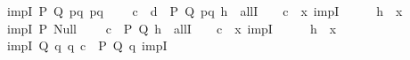 \begin{isabellebody}
%
\isadelimproof
%
\endisadelimproof
\isanewline
\isanewline
{}\isamarkupfalse%
\isanewline
\ \ impI\ {\isacharparenleft}{\kern0pt}P{\isacharcomma}{\kern0pt}\ Q{\isacharparenright}{\kern0pt}{\isacharcolon}{\kern0pt}\ {\isachardoublequoteopen}{\isasymlambda}pq{\isachardot}{\kern0pt}\ pq{\isachardoublequoteclose}\isanewline
\ \ \ \ {\isachardoublequoteopen}\isactrlbold {\isasymlambda}{\isacharparenleft}{\kern0pt}c{\isacharcolon}{\kern0pt}\ {\isacharunderscore}{\kern0pt}{\isacharparenright}{\kern0pt}\ {\isacharparenleft}{\kern0pt}d{\isacharcolon}{\kern0pt}\ {\isacharunderscore}{\kern0pt}{\isacharparenright}{\kern0pt}\ P\ Q\ pq\ {\isacharparenleft}{\kern0pt}h{\isacharcolon}{\kern0pt}\ {\isacharunderscore}{\kern0pt}{\isacharparenright}{\kern0pt}{\isachardot}{\kern0pt}\ allI\ {\isasymcdot}\ {\isacharunderscore}{\kern0pt}\ {\isasymbullet}\ c\ {\isasymbullet}\ {\isacharparenleft}{\kern0pt}\isactrlbold {\isasymlambda}x{\isachardot}{\kern0pt}\ impI\ {\isasymcdot}\ {\isacharunderscore}{\kern0pt}\ {\isasymcdot}\ {\isacharunderscore}{\kern0pt}\ {\isasymbullet}\ {\isacharparenleft}{\kern0pt}h\ {\isasymcdot}\ x{\isacharparenright}{\kern0pt}{\isacharparenright}{\kern0pt}{\isachardoublequoteclose}\isanewline
\isanewline
\ \ impI\ {\isacharparenleft}{\kern0pt}P{\isacharparenright}{\kern0pt}{\isacharcolon}{\kern0pt}\ {\isachardoublequoteopen}Null{\isachardoublequoteclose}\isanewline
\ \ \ \ {\isachardoublequoteopen}\isactrlbold {\isasymlambda}{\isacharparenleft}{\kern0pt}c{\isacharcolon}{\kern0pt}\ {\isacharunderscore}{\kern0pt}{\isacharparenright}{\kern0pt}\ P\ Q\ {\isacharparenleft}{\kern0pt}h{\isacharcolon}{\kern0pt}\ {\isacharunderscore}{\kern0pt}{\isacharparenright}{\kern0pt}{\isachardot}{\kern0pt}\ allI\ {\isasymcdot}\ {\isacharunderscore}{\kern0pt}\ {\isasymbullet}\ c\ {\isasymbullet}\ {\isacharparenleft}{\kern0pt}\isactrlbold {\isasymlambda}x{\isachardot}{\kern0pt}\ impI\ {\isasymcdot}\ {\isacharunderscore}{\kern0pt}\ {\isasymcdot}\ {\isacharunderscore}{\kern0pt}\ {\isasymbullet}\ {\isacharparenleft}{\kern0pt}h\ {\isasymcdot}\ x{\isacharparenright}{\kern0pt}{\isacharparenright}{\kern0pt}{\isachardoublequoteclose}\isanewline
\isanewline
\ \ impI\ {\isacharparenleft}{\kern0pt}Q{\isacharparenright}{\kern0pt}{\isacharcolon}{\kern0pt}\ {\isachardoublequoteopen}{\isasymlambda}q{\isachardot}{\kern0pt}\ q{\isachardoublequoteclose}\ {\isachardoublequoteopen}\isactrlbold {\isasymlambda}{\isacharparenleft}{\kern0pt}c{\isacharcolon}{\kern0pt}\ {\isacharunderscore}{\kern0pt}{\isacharparenright}{\kern0pt}\ P\ Q\ q{\isachardot}{\kern0pt}\ impI\ {\isasymcdot}\ {\isacharunderscore}{\kern0pt}\ {\isasymcdot}\ {\isacharunderscore}{\kern0pt}{\isachardoublequoteclose}\isanewline

\end{isabellebody}
